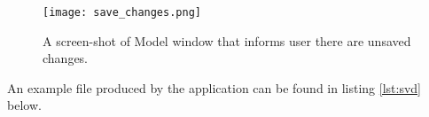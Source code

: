 \begin{figure}[h]
\centering
\texttt{[image: save\_changes.png]}
\caption{A screen-shot of Model window that informs user there are unsaved changes.}
\label{fig:saveview}
\end{figure}

An example file produced by the application can be found in listing \ref{lst:svd} below.    

\begin{center}
\lstset{language=XML, basicstyle=\footnotesize\ttfamily, caption=XML file used to store image labels,frame=single,captionpos=b,label=lst:svd}

\end{center}
